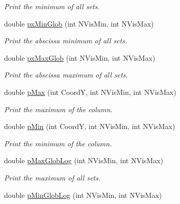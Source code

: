 \begin{DoxyCompactItemize}
\begin{DoxyCompactList}\small\item\em Print the minimum of all sets. \end{DoxyCompactList}\item 
double \hyperlink{classVarDatFile_a6c9b0181c2505369c375bcb91f36409f}{px\+Min\+Glob} (int N\+Vis\+Min, int N\+Vis\+Max)\hypertarget{classVarDatFile_a6c9b0181c2505369c375bcb91f36409f}{}\label{classVarDatFile_a6c9b0181c2505369c375bcb91f36409f}

\begin{DoxyCompactList}\small\item\em Print the abscissa minimum of all sets. \end{DoxyCompactList}\item 
double \hyperlink{classVarDatFile_ab594ce06a5fb24acf5c812f2d02fde06}{px\+Max\+Glob} (int N\+Vis\+Min, int N\+Vis\+Max)\hypertarget{classVarDatFile_ab594ce06a5fb24acf5c812f2d02fde06}{}\label{classVarDatFile_ab594ce06a5fb24acf5c812f2d02fde06}

\begin{DoxyCompactList}\small\item\em Print the abscissa maximum of all sets. \end{DoxyCompactList}\item 
double \hyperlink{classVarDatFile_a3aea9835fc67f13c5b334e1a34af1be9}{p\+Max} (int CoordY, int N\+Vis\+Min, int N\+Vis\+Max)
\begin{DoxyCompactList}\small\item\em Print the maximum of the column. \end{DoxyCompactList}\item 
double \hyperlink{classVarDatFile_afd9d7e4b40e8991b685d17cb65a38441}{p\+Min} (int CoordY, int N\+Vis\+Min, int N\+Vis\+Max)
\begin{DoxyCompactList}\small\item\em Print the minimum of the column. \end{DoxyCompactList}\item 
double \hyperlink{classVarDatFile_ad89c34d0afecf90978d5e36bf57e1bf0}{p\+Max\+Glob\+Log} (int N\+Vis\+Min, int N\+Vis\+Max)\hypertarget{classVarDatFile_ad89c34d0afecf90978d5e36bf57e1bf0}{}\label{classVarDatFile_ad89c34d0afecf90978d5e36bf57e1bf0}

\begin{DoxyCompactList}\small\item\em Print the maximum of all sets. \end{DoxyCompactList}\item 
double \hyperlink{classVarDatFile_ad47c958de7bca595ab42666050cac660}{p\+Min\+Glob\+Log} (int N\+Vis\+Min, int N\+Vis\+Max)\hypertarget{classVarDatFile_ad47c958de7bca595ab42666050cac660}{}\label{classVarDatFile_ad47c958de7bca595ab42666050cac660}


\end{DoxyCompactItemize}
